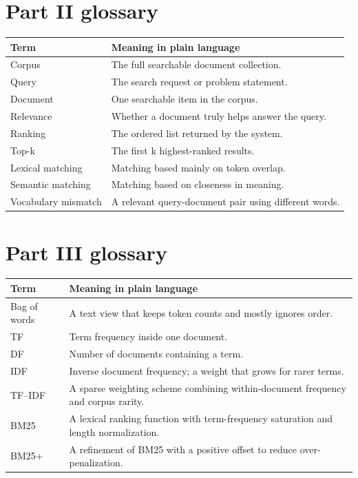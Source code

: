 \documentclass[11pt,oneside]{report}
\begin{document}
\chapter*{Part II glossary}
\begin{longtable}{p{}p{}}
\toprule
\textbf{Term} & \textbf{Meaning in plain language} \\ \midrule
Corpus & The full searchable document collection. \\ \midrule
Query & The search request or problem statement. \\ \midrule
Document & One searchable item in the corpus. \\ \midrule
Relevance & Whether a document truly helps answer the query. \\ \midrule
Ranking & The ordered list returned by the system. \\ \midrule
Top-k & The first k highest-ranked results. \\ \midrule
Lexical matching & Matching based mainly on token overlap. \\ \midrule
Semantic matching & Matching based on closeness in meaning. \\ \midrule
Vocabulary mismatch & A relevant query-document pair using different words. \\
\bottomrule
\end{longtable}


\chapter*{Part III glossary}
\begin{longtable}{p{}p{}}
\toprule
\textbf{Term} & \textbf{Meaning in plain language} \\ \midrule
Bag of words & A text view that keeps token counts and mostly ignores order. \\ \midrule
TF & Term frequency inside one document. \\ \midrule
DF & Number of documents containing a term. \\ \midrule
IDF & Inverse document frequency; a weight that grows for rarer terms. \\ \midrule
TF--IDF & A sparse weighting scheme combining within-document frequency and corpus rarity. \\ \midrule
BM25 & A lexical ranking function with term-frequency saturation and length normalization. \\ \midrule
BM25+ & A refinement of BM25 with a positive offset to reduce over-penalization. \\
\bottomrule
\end{longtable}
\end{document}

